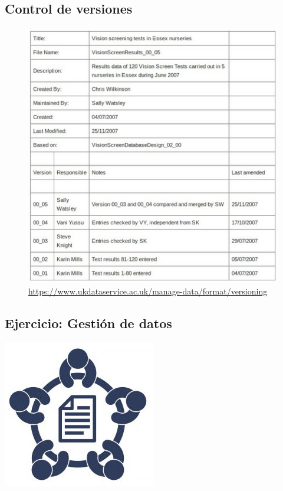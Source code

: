 \hypertarget{control-versiones}{%
\subsection{Control de versiones}\label{control-versiones}}

\begin{figure}
\centering
\includegraphics{imagenes-cuali/VersionControlTable.jpg}
\caption{\url{https://www.ukdataservice.ac.uk/manage-data/format/versioning}}
\end{figure}

\hypertarget{ejercicio-gestion}{%
\subsection{Ejercicio: Gestión de datos}\label{ejercicio-gestion}}

\leavevmode\hypertarget{column2}{}%
\includegraphics{img/GroupWork.jpg}

